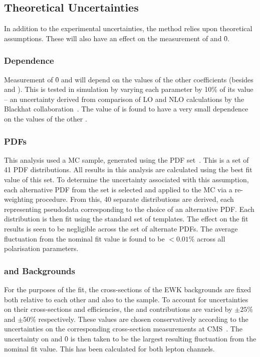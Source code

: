 \subsection{Theoretical Uncertainties}
In addition to the experimental uncertainties, the method relies upon
theoretical assumptions. These will also have an effect on the measurement of
\fLmfR and \f0.

\subsubsection{\Ai Dependence}
Measurement of \f0 and \fLmfR will depend on the values of the other \Ai
coefficients (besides \Azero and \Afour). This is tested in simulation by
varying each parameter \Ai by 10\% of its value -- an uncertainty derived from
comparison of \ac{LO} and \ac{NLO} calculations by the Blackhat
collaboration~\cite{berger_nlo_qcd_wjet}. The value of \fLmfR is found to have a
very small dependence on the values of the other \Ai.

\subsubsection{\aclp{PDF}}
\label{sec:wpol_syst_pdf}
This analysis used a \Wjets \ac{MC} sample, generated using the \cteqsixlone
\ac{PDF} set~\cite{cteq6l1}. This is a set of 41 \ac{PDF} distributions. All
results in this analysis are calculated using the best fit value of this set. To
determine the uncertainty associated with this assumption, each alternative
\ac{PDF} from the set is selected and applied to the \ac{MC} via a re-weighting
procedure. From this, 40 separate \LP distributions are derived, each
representing pseudodata corresponding to the choice of an alternative
\ac{PDF}. Each distribution is then fit using the standard set of templates. The
effect on the fit results is seen to be negligible across the set of alternate
\acp{PDF}. The average fluctuation from the nominal fit value is found to be $<
0.01\%$ across all polarisation parameters.

\subsubsection{\Zjets and \ttbar Backgrounds}
For the purposes of the fit, the cross-sections of the \ac{EWK} backgrounds are
fixed both relative to each other and also to the \Wjets sample. To account for
uncertainties on their cross-sections and efficiencies, the \Zjets and \ttbar
contributions are varied by $\pm 25\%$ and $\pm 50\%$ respectively. These
values are chosen conservatively according to the uncertainties on the
corresponding cross-section measurements at
\ac{CMS}~\cite{cms_wz_pas,cms_ttbar_paper}. The uncertainty on \fLmfR and \f0 is
then taken to be the largest resulting fluctuation from the nominal fit
value. This has been calculated for both lepton channels.

